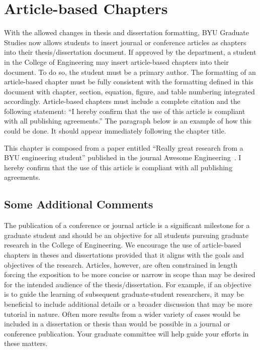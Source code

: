 \chapter{Article-based Chapters}
\label{ch:article_based_chap}

With the allowed changes in thesis and dissertation formatting, BYU Graduate Studies now allows students to insert journal or conference articles as chapters into their thesis/dissertation document. If approved by the department, a student in the College of Engineering may insert article-based chapters into their document. To do so, the student must be a primary author. The formatting of an article-based chapter must be fully consistent with the formatting defined in this document with chapter, section, equation, figure, and table numbering integrated accordingly. Article-based chapters must include a complete citation and the following statement: ``I hereby confirm that the use of this article is compliant with all publishing agreements.'' The paragraph below is an example of how this could be done. It should appear immediately following the chapter title.

\vspace{0.1in}
\noindent This chapter is composed from a paper entitled ``Really great research from
a BYU engineering student'' published in the journal Awesome Engineering~\autocite{StudentRP20}.
I hereby confirm that the use of this article is compliant with all publishing agreements.



\section{Some Additional Comments}
The publication of a conference or journal article is a significant milestone for a graduate 
student and should be an objective for all students pursuing graduate research in the College 
of Engineering. We encourage the use of article-based chapters in theses and dissertations 
provided that it aligns with the goals and objectives of the research. Articles, however, 
are often constrained in length forcing the exposition to be more concise or narrow in 
scope than may be desired for the intended audience of the thesis/dissertation. For example, 
if an objective is to guide the learning of subsequent graduate-student researchers, it 
may be beneficial to include additional details or a broader discussion that may be more 
tutorial in nature. Often more results from a wider variety of cases would be included 
in a dissertation or thesis than would be possible in a journal or conference publication. 
Your graduate committee will help guide your efforts in these matters.
